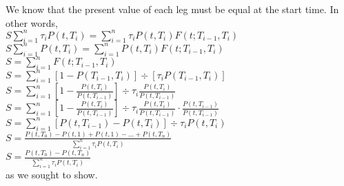 \documentclass{article}
\begin{document}
{We know that the present value of each leg must be equal at the start time. In other words, \\
$S\sum_{i=1}^{n} \tau_i P(t, T_i) = \sum_{i=1}^{n} \tau_i P(t, T_i)F(t; T_{i-1}, T_i)$ \\ 
$S\sum_{i=1}^{n} P(t, T_i) = \sum_{i=1}^{n} P(t, T_i)F(t; T_{i-1}, T_i)$ \\ 
$S = \sum_{i=1}^{n} F(t; T_{i-1}, T_i)$ \\ 
$S = \sum_{i=1}^{n} [1 - P(T_{i-1}, T_i)] \div [\tau_iP(T_{i-1}, T_i)]$ \\ 
$S = \sum_{i=1}^{n} [1 - \frac{P(t, T_i)}{P(t, T_{i-1})}] \div \tau_i \frac{P(t, T_i)}{P(t, T_{i-1})}$ \\ 
$S = \sum_{i=1}^{n} [1 - \frac{P(t, T_i)}{P(t, T_{i-1})}] \div \tau_i \frac{P(t, T_i)}{P(t, T_{i-1})} \cdot \frac{P(t, T_{i-1})}{P(t, T_{i-1})}$ \\ 
$S = \sum_{i=1}^{n} [P(t, T_{i-1}) - P(t, T_i)] \div \tau_i P(t, T_i)  $ \\ 
$S = \frac{P(t, T_0) - P(t, 1) + P(t, 1) - \dots + P(t, T_n)}{\sum_{i=1}^{n} \tau_i P(t, T_i)}  $ \\ 
$S = \frac{P(t, T_0) - P(t, T_n)}{\sum_{i=1}^{n} \tau_i P(t, T_i)} $ \\
as we sought to show.

}
\end{document}
